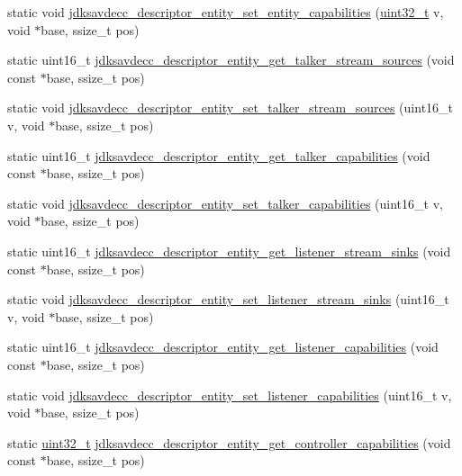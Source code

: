\begin{DoxyCompactItemize}
\item 
static void \hyperlink{group__descriptor__entity_ga1a1cc17b546b6b01df91e12d8c16b002}{jdksavdecc\+\_\+descriptor\+\_\+entity\+\_\+set\+\_\+entity\+\_\+capabilities} (\hyperlink{parse_8c_a6eb1e68cc391dd753bc8ce896dbb8315}{uint32\+\_\+t} v, void $\ast$base, ssize\+\_\+t pos)
\item 
static uint16\+\_\+t \hyperlink{group__descriptor__entity_gabef6a9081299ffcd6ab0f1b2f279078e}{jdksavdecc\+\_\+descriptor\+\_\+entity\+\_\+get\+\_\+talker\+\_\+stream\+\_\+sources} (void const $\ast$base, ssize\+\_\+t pos)
\item 
static void \hyperlink{group__descriptor__entity_ga15b656a41fed36bfa5663b3ef9698152}{jdksavdecc\+\_\+descriptor\+\_\+entity\+\_\+set\+\_\+talker\+\_\+stream\+\_\+sources} (uint16\+\_\+t v, void $\ast$base, ssize\+\_\+t pos)
\item 
static uint16\+\_\+t \hyperlink{group__descriptor__entity_ga6e9408d48ca7143f7f6a91d5edfdca64}{jdksavdecc\+\_\+descriptor\+\_\+entity\+\_\+get\+\_\+talker\+\_\+capabilities} (void const $\ast$base, ssize\+\_\+t pos)
\item 
static void \hyperlink{group__descriptor__entity_gaa684191c7c3c055f1b36ab57cc05ff32}{jdksavdecc\+\_\+descriptor\+\_\+entity\+\_\+set\+\_\+talker\+\_\+capabilities} (uint16\+\_\+t v, void $\ast$base, ssize\+\_\+t pos)
\item 
static uint16\+\_\+t \hyperlink{group__descriptor__entity_ga636fbd56265c94584e11e7e7635808da}{jdksavdecc\+\_\+descriptor\+\_\+entity\+\_\+get\+\_\+listener\+\_\+stream\+\_\+sinks} (void const $\ast$base, ssize\+\_\+t pos)
\item 
static void \hyperlink{group__descriptor__entity_gad42d175b456cbebc640cb8c65da07502}{jdksavdecc\+\_\+descriptor\+\_\+entity\+\_\+set\+\_\+listener\+\_\+stream\+\_\+sinks} (uint16\+\_\+t v, void $\ast$base, ssize\+\_\+t pos)
\item 
static uint16\+\_\+t \hyperlink{group__descriptor__entity_gac130520aa287ef74c805c057fbcd556b}{jdksavdecc\+\_\+descriptor\+\_\+entity\+\_\+get\+\_\+listener\+\_\+capabilities} (void const $\ast$base, ssize\+\_\+t pos)
\item 
static void \hyperlink{group__descriptor__entity_ga9ac6c7fb1f7fe29f29e40623c462964e}{jdksavdecc\+\_\+descriptor\+\_\+entity\+\_\+set\+\_\+listener\+\_\+capabilities} (uint16\+\_\+t v, void $\ast$base, ssize\+\_\+t pos)
\item 
static \hyperlink{parse_8c_a6eb1e68cc391dd753bc8ce896dbb8315}{uint32\+\_\+t} \hyperlink{group__descriptor__entity_ga46014717b51ae8ba2e1e0e7da380025f}{jdksavdecc\+\_\+descriptor\+\_\+entity\+\_\+get\+\_\+controller\+\_\+capabilities} (void const $\ast$base, ssize\+\_\+t pos)

\end{DoxyCompactItemize}

